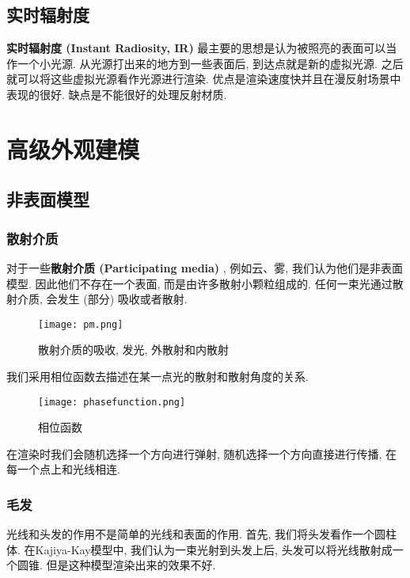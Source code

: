 \subsection{实时辐射度}

\textbf{实时辐射度 (Instant Radiosity, IR) }最主要的思想是认为被照亮的表面可以当作一个小光源. 从光源打出来的地方到一些表面后, 到达点就是新的虚拟光源. 之后就可以将这些虚拟光源看作光源进行渲染. 优点是渲染速度快并且在漫反射场景中表现的很好. 缺点是不能很好的处理反射材质. 

\section{高级外观建模}

\subsection{非表面模型}

\subsubsection{散射介质}

对于一些\textbf{散射介质 (Participating media) }, 例如云、雾, 我们认为他们是非表面模型. 因此他们不存在一个表面, 而是由许多散射小颗粒组成的. 任何一束光通过散射介质, 会发生 (部分) 吸收或者散射. 

\begin{figure}[H]
	\centering
	\texttt{[image: pm.png]}
	\caption{散射介质的吸收, 发光, 外散射和内散射}
	\label{fig:pm}
\end{figure}

我们采用相位函数去描述在某一点光的散射和散射角度的关系. 

\begin{figure}[H]
	\centering
	\texttt{[image: phasefunction.png]}
	\caption{相位函数}
	\label{fig:pf}
\end{figure}

在渲染时我们会随机选择一个方向进行弹射, 随机选择一个方向直接进行传播, 在每一个点上和光线相连. 

\subsubsection{毛发}

光线和头发的作用不是简单的光线和表面的作用. 首先, 我们将头发看作一个圆柱体. 在Kajiya-Kay模型中, 我们认为一束光射到头发上后, 头发可以将光线散射成一个圆锥. 但是这种模型渲染出来的效果不好. 

